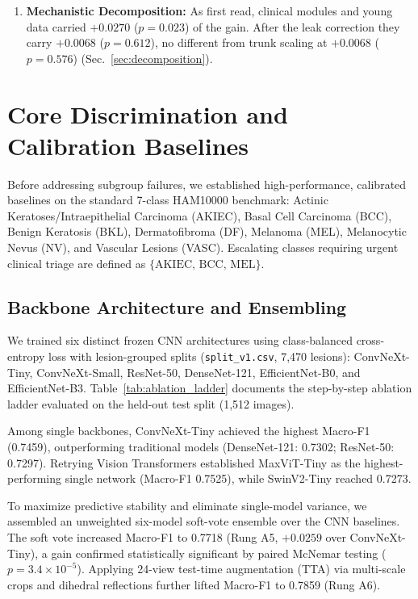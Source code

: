 \documentclass[journal]{IEEEtran}
\newcommand{\escset}{\{\text{AKIEC},\,\text{BCC},\,\text{MEL}\}}
\begin{document}
\begin{enumerate}
\item \textbf{Mechanistic Decomposition:} As first read, clinical modules and young data carried $+0.0270$ ($p = 0.023$) of the gain. After the leak correction they carry $+0.0068$ ($p = 0.612$), no different from trunk scaling at $+0.0068$ ($p = 0.576$) (Sec.~\ref{sec:decomposition}).
\end{enumerate}

\section{Core Discrimination and Calibration Baselines}\label{sec:core_baselines}

Before addressing subgroup failures, we established high-performance, calibrated baselines on the standard 7-class HAM10000 benchmark: Actinic Keratoses/Intraepithelial Carcinoma (AKIEC), Basal Cell Carcinoma (BCC), Benign Keratosis (BKL), Dermatofibroma (DF), Melanoma (MEL), Melanocytic Nevus (NV), and Vascular Lesions (VASC). Escalating classes requiring urgent clinical triage are defined as $\escset$.

\subsection{Backbone Architecture and Ensembling}
We trained six distinct frozen CNN architectures using class-balanced cross-entropy loss with lesion-grouped splits (\texttt{split\_v1.csv}, 7,470 lesions): ConvNeXt-Tiny, ConvNeXt-Small, ResNet-50, DenseNet-121, EfficientNet-B0, and EfficientNet-B3. Table~\ref{tab:ablation_ladder} documents the step-by-step ablation ladder evaluated on the held-out test split (1,512 images). 

Among single backbones, ConvNeXt-Tiny achieved the highest Macro-F1 (0.7459), outperforming traditional models (DenseNet-121: 0.7302; ResNet-50: 0.7297). Retrying Vision Transformers established MaxViT-Tiny as the highest-performing single network (Macro-F1 0.7525), while SwinV2-Tiny reached 0.7273. 

To maximize predictive stability and eliminate single-model variance, we assembled an unweighted six-model soft-vote ensemble over the CNN baselines. The soft vote increased Macro-F1 to 0.7718 (Rung A5, $+0.0259$ over ConvNeXt-Tiny), a gain confirmed statistically significant by paired McNemar testing ($p = 3.4 \times 10^{-5}$). Applying 24-view test-time augmentation (TTA) via multi-scale crops and dihedral reflections further lifted Macro-F1 to 0.7859 (Rung A6).
\end{document}
